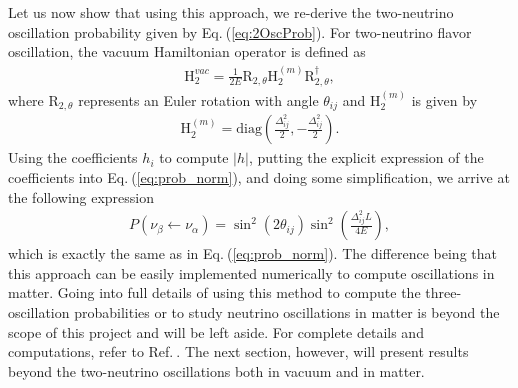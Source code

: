 \documentclass[twocolumn,secnumarabic,amssymb, nobibnotes, aps, prd,10pt]{revtex4-1}
\newcommand{\Eq}[1]{Eq.$\:$(\ref{#1})}
\newcommand{\myref}[1]{Ref.$\:$\cite{#1}}
\begin{document}
Let us now show that using this approach, we re-derive the two-neutrino oscillation
probability given by \Eq{eq:2OscProb}. For two-neutrino flavor oscillation, the vacuum
Hamiltonian operator is defined as
\begin{align}
\mathrm{H}_2^{vac} = \frac{1}{2 E} \mathrm{R}_{2, \theta} \mathrm{H}^{(m)}_2 
\mathrm{R}_{2, \theta}^\dagger ,
\end{align}
where $\mathrm{R}_{2, \theta}$ represents an Euler rotation with angle $\theta_{ij}$
and $\mathrm{H}^{(m)}_2$ is given by 
\begin{align}
\mathrm{H}^{(m)}_2 = \mathrm{diag} \left( \frac{\Delta_{ij}^2}{2}, - \frac{\Delta_{ij}^2}{2} \right). 
\end{align}
Using the coefficients $h_i$ to compute $\vert h \vert$, putting the explicit expression 
of the coefficients into \Eq{eq:prob_norm}, and doing some simplification, we arrive at 
the following expression
\begin{align}
P (\nu_\beta \longleftarrow \nu_\alpha) = \sin^2 (2 \theta_{ij}) \sin^2 \left(
\frac{\Delta_{ij}^2 L}{4 E} \right) ,
\end{align} 
which is exactly the same as in \Eq{eq:prob_norm}. The difference being that this approach
can be easily implemented numerically to compute oscillations in matter. Going into full
details of using this method to compute the three-oscillation probabilities or to study
neutrino oscillations in matter is beyond the scope of this project and will be left
aside. For complete details and computations, refer to \myref{}. The next section, however,
will present results beyond the two-neutrino oscillations both in vacuum and in matter.
\end{document}

